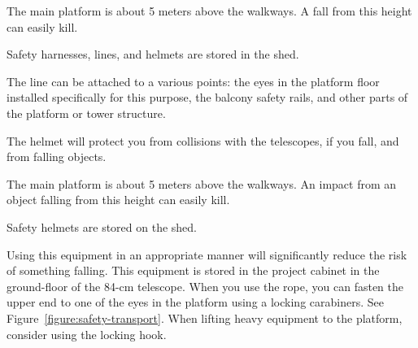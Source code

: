 
The main platform is about 5 meters above the walkways. A fall from this height can easily kill.

Safety harnesses, lines, and helmets are stored in the shed.

The line can be attached to a various points: the eyes in the platform floor installed specifically for this purpose, the balcony safety rails, and other parts of the platform or tower structure.

The helmet will protect you from collisions with the telescopes, if you fall, and from falling objects.


The main platform is about 5 meters above the walkways. An impact from an object falling from this height can easily kill.

Safety helmets are stored on the shed.


Using this equipment in an appropriate manner will significantly reduce the risk of something falling. This equipment is stored in the project cabinet in the ground-floor of the 84-cm telescope. When you use the rope, you can fasten the upper end to one of the eyes in the platform using a locking carabiners. See Figure~\ref{figure:safety-transport}. When lifting heavy equipment to the platform, consider using the locking hook. 

